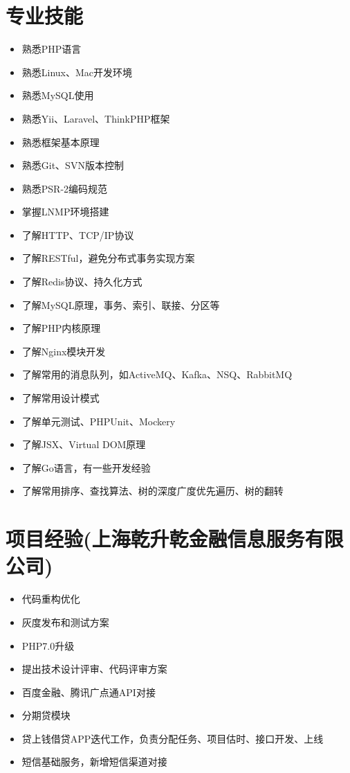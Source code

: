 \documentclass[a4paper,12pt]{article}
\begin{document}
\begin{CJK}{UTF8}{gbsn}
		\section{专业技能}
			\begin{itemize}
				\item{熟悉PHP语言}
				\item{熟悉Linux、Mac开发环境}
				\item{熟悉MySQL使用}
				\item{熟悉Yii、Laravel、ThinkPHP框架}
				\item{熟悉框架基本原理}
				\item{熟悉Git、SVN版本控制}
				\item{熟悉PSR-2编码规范}
				\item{掌握LNMP环境搭建}
				\item{了解HTTP、TCP/IP协议}
				\item{了解RESTful，避免分布式事务实现方案}
				\item{了解Redis协议、持久化方式}
				\item{了解MySQL原理，事务、索引、联接、分区等}
				\item{了解PHP内核原理}
				\item{了解Nginx模块开发}
				\item{了解常用的消息队列，如ActiveMQ、Kafka、NSQ、RabbitMQ}
				\item{了解常用设计模式}
				\item{了解单元测试、PHPUnit、Mockery}
				\item{了解JSX、Virtual DOM原理}
				\item{了解Go语言，有一些开发经验}
				\item{了解常用排序、查找算法、树的深度广度优先遍历、树的翻转}
			\end{itemize}
		
		\section{项目经验(上海乾升乾金融信息服务有限公司)}
			\begin{itemize}
				\item{代码重构优化}
				\item{灰度发布和测试方案}
                			\item{PHP7.0升级}
                			\item{提出技术设计评审、代码评审方案} 
				\item{百度金融、腾讯广点通API对接}
				\item{分期贷模块}
				\item{贷上钱借贷APP迭代工作，负责分配任务、项目估时、接口开发、上线}
				\item{短信基础服务，新增短信渠道对接}
			\end{itemize}
			

\end{CJK}
\end{document}
